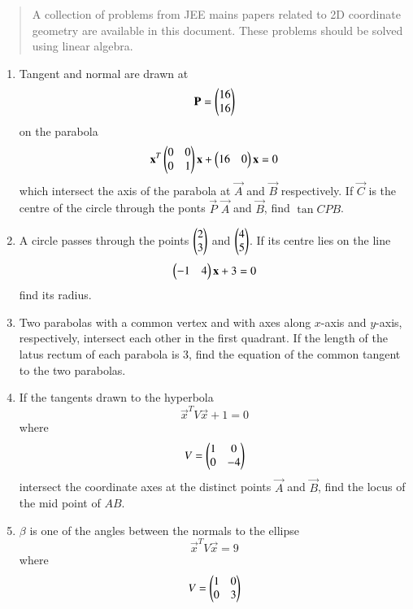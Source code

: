 \documentclass[journal,12pt,twocolumn]{IEEEtran}
\begin{document}
\begin{abstract}
	A  collection of problems from JEE mains papers related to 2D coordinate geometry are 
available in this document.  These problems should be solved using linear algebra.
\end{abstract}
\begin{enumerate}[label=\arabic*.]
\item Tangent and normal are drawn at 
\begin{equation}
\mathbf{P}= \begin{pmatrix}16 \\ 16\end{pmatrix}
\end{equation}
on the parabola 
\begin{equation}
\mathbf{x}^T\begin{pmatrix}0 & 0 \\ 0 & 1\end{pmatrix}\mathbf{x} + \begin{pmatrix}16 & 0\end{pmatrix}\mathbf{x} =0
\end{equation}
%
which intersect the axis of the parabola at $\vec{A}$ and $\vec{B}$ respectively.  If $\vec{C}$ is the centre 
of the circle through the ponts $\vec{P}$ $\vec{A}$ and $\vec{B}$, find $\tan  CPB$.
\item A circle passes through the points $\begin{pmatrix}2 \\ 3\end{pmatrix}$ and $\begin{pmatrix}4 \\  5\end{pmatrix}$.  If its centre lies on the 
line
\begin{equation}
\begin{pmatrix}-1 & 4\end{pmatrix}\mathbf{x} + 3 =0
\end{equation}
%
find its radius.
%
\item Two parabolas with a common vertex and with axes along $x$-axis and $y$-axis, respectively, intersect 
each other in the first quadrant.  If the length of the latus rectum of each parabola is 3, find the equation 
of the common tangent to the two parabolas.
%
\item If the tangents drawn to the hyperbola 
\begin{equation}
\vec{x}^TV\vec{x} +1=0
\end{equation}
%
where
\begin{equation}
V = \begin{pmatrix}1 & 0 \\ 0 & -4\end{pmatrix}
\end{equation}
%
intersect the coordinate axes at the distinct points $\vec{A}$ and $\vec{B}$, find the locus of the mid point 
of $AB$.
\item $\beta$ is one of the angles between the normals to the ellipse
\begin{equation}
\vec{x}^TV\vec{x} =9
\end{equation}
%
where
\begin{equation}
V = \myvec{1 & 0 \\ 0 & 3}

\end{equation}
\end{enumerate}
\end{document}
